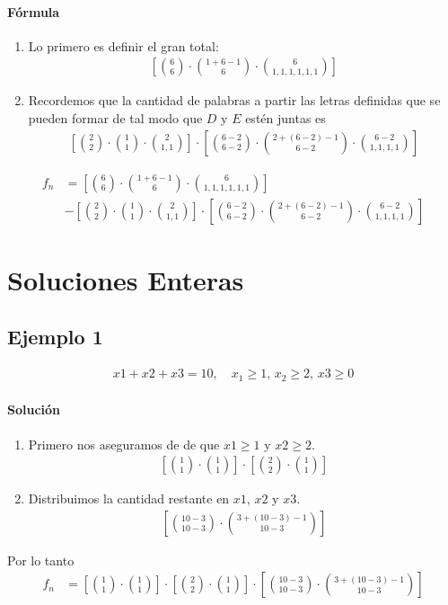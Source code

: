 \paragraph{Fórmula}
\begin{enumerate}
\item Lo primero es definir el gran total:
\begin{align*}
\left[\binom{6}{6}\cdot\binom{1+6-1}{6}\cdot\binom{6}{1,1,1,1,1,1}\right]
\end{align*}
\item Recordemos que la cantidad de palabras a partir las letras definidas que se pueden formar de tal modo que $D$ y $E$ estén juntas es
\begin{align*}
\left[\binom{2}{2}\cdot\binom{1}{1}\cdot\binom{2}{1,1}\right]
\cdot
\left[\binom{6-2}{6-2}\cdot\binom{2+(6-2)-1}{6-2}\cdot\binom{6-2}{1,1,1,1}\right]
\end{align*}
\end{enumerate}

\begin{align*}
f_n&=\left[\binom{6}{6}\cdot\binom{1+6-1}{6}\cdot\binom{6}{1,1,1,1,1,1}\right]\\&-
\left[\binom{2}{2}\cdot\binom{1}{1}\cdot\binom{2}{1,1}\right]
\cdot
\left[\binom{6-2}{6-2}\cdot\binom{2+(6-2)-1}{6-2}\cdot\binom{6-2}{1,1,1,1}\right]
\end{align*}

\section{Soluciones Enteras}

\subsection{Ejemplo 1}
\begin{align*}
x1+x2+x3=10,\quad x_1\geq 1,\,x_2\geq 2,\, x3 \geq 0
\end{align*}

\paragraph{Solución}
\begin{enumerate}
\item Primero nos aseguramos de de que $x1\geq1$ y $x2\geq2$.
\begin{align*}
\left[\binom{1}{1}\cdot\binom{1}{1}\right]\cdot\left[\binom{2}{2}\cdot\binom{1}{1}\right]
\end{align*}
\item Distribuimos la cantidad restante en $x1$, $x2$ y $x3$.
\begin{align*}
\left[\binom{10-3}{10-3}\cdot\binom{3+(10-3)-1}{10-3}\right]
\end{align*}
\end{enumerate}
Por lo tanto
\begin{align*}
f_n&=
\left[\binom{1}{1}\cdot\binom{1}{1}\right]\cdot\left[\binom{2}{2}\cdot\binom{1}{1}\right]\cdot\left[\binom{10-3}{10-3}\cdot\binom{3+(10-3)-1}{10-3}\right]
\end{align*}
